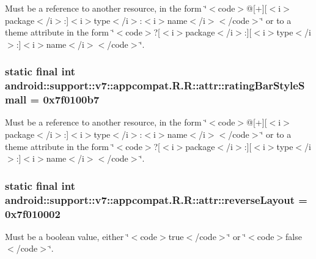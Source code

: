 Must be a reference to another resource, in the form \char`\"{}$<$code$>$@\mbox{[}+\mbox{]}\mbox{[}$<$i$>$package$<$/i$>$:\mbox{]}$<$i$>$type$<$/i$>$:$<$i$>$name$<$/i$>$$<$/code$>$\char`\"{} or to a theme attribute in the form \char`\"{}$<$code$>$?\mbox{[}$<$i$>$package$<$/i$>$:\mbox{]}\mbox{[}$<$i$>$type$<$/i$>$:\mbox{]}$<$i$>$name$<$/i$>$$<$/code$>$\char`\"{}. \hypertarget{classandroid_1_1support_1_1v7_1_1appcompat_1_1_r_1_1attr_b25df3c67d39ae1c9d5ed432bca3548d}{
\subsubsection[{ratingBarStyleSmall}]{\setlength{\rightskip}{0pt plus 5cm}static final int android::support::v7::appcompat.R.R::attr::ratingBarStyleSmall = 0x7f0100b7}}
\label{classandroid_1_1support_1_1v7_1_1appcompat_1_1_r_1_1attr_b25df3c67d39ae1c9d5ed432bca3548d}


Must be a reference to another resource, in the form \char`\"{}$<$code$>$@\mbox{[}+\mbox{]}\mbox{[}$<$i$>$package$<$/i$>$:\mbox{]}$<$i$>$type$<$/i$>$:$<$i$>$name$<$/i$>$$<$/code$>$\char`\"{} or to a theme attribute in the form \char`\"{}$<$code$>$?\mbox{[}$<$i$>$package$<$/i$>$:\mbox{]}\mbox{[}$<$i$>$type$<$/i$>$:\mbox{]}$<$i$>$name$<$/i$>$$<$/code$>$\char`\"{}. \hypertarget{classandroid_1_1support_1_1v7_1_1appcompat_1_1_r_1_1attr_29482e373e53479124ff8680f34f6a13}{
\subsubsection[{reverseLayout}]{\setlength{\rightskip}{0pt plus 5cm}static final int android::support::v7::appcompat.R.R::attr::reverseLayout = 0x7f010002}}
\label{classandroid_1_1support_1_1v7_1_1appcompat_1_1_r_1_1attr_29482e373e53479124ff8680f34f6a13}


Must be a boolean value, either \char`\"{}$<$code$>$true$<$/code$>$\char`\"{} or \char`\"{}$<$code$>$false$<$/code$>$\char`\"{}. 

